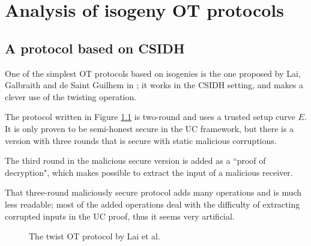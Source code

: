 \chapter{Analysis of isogeny OT protocols}

\section{A protocol based on CSIDH}
One of the simplest OT protocols based on isogenies is the one proposed by Lai, Galbraith and de Saint Guilhem in \cite{Lai_twists}; it works in the CSIDH setting, and makes a clever use of the twisting operation.

The protocol written in Figure \ref{prot_twist} is two-round and uses a trusted setup curve $E$. It is only proven to be semi-honest secure  in the UC framework, but there is a version with three rounds that is secure with static malicious corruptions.

The third round in the malicious secure version is added as a ``proof of decryption", which makes possible to extract the input of a malicious receiver.

That three-round maliciously secure protocol adds many operations and is much less readable; most of the added operations deal with the difficulty of extracting corrupted inputs in the UC proof, thus it seems very artificial.

\begin{figure}
    \caption{The twist OT protocol by Lai et al.}
    \label{prot_twist}
\end{figure}


